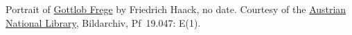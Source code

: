 Portrait
of \href{https://www.bildarchivaustria.at/Pages/ImageDetail.aspx?p_iBildID=13886913}{Gottlob
Frege} by Friedrich Haack, no date. Courtesy of
the \href{https://www.bildarchivaustria.at/}{Austrian National
Library}, Bildarchiv, Pf~19.047: E(1).
